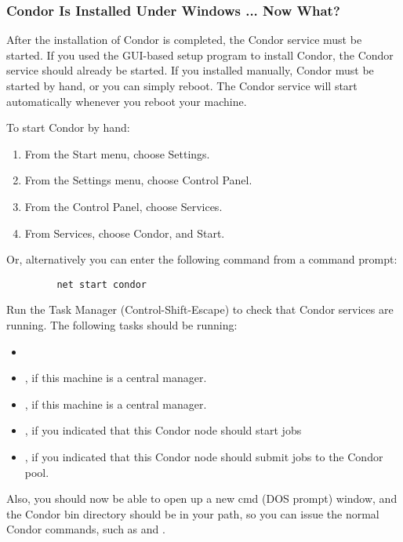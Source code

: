 \subsubsection{\label{nt-installed-now-what}
Condor Is Installed Under Windows ... Now What?}

After the installation of Condor is completed, the Condor service
must be started.  If you used the GUI-based setup program to install
Condor, the Condor service should already be started.  If you installed
manually, Condor must
be started by hand, or you can simply reboot. \Note The Condor service
will start automatically whenever you reboot your machine.

To start Condor by hand:
\begin{enumerate}
\item From the Start menu, choose Settings.
\item From the Settings menu, choose Control Panel.
\item From the Control Panel, choose Services.
\item From Services, choose Condor, and Start.
\end{enumerate}

Or, alternatively you can enter the following command from a command prompt:
\begin{verbatim}
         net start condor
\end{verbatim}

Run the Task Manager (Control-Shift-Escape) to check that Condor
services are running.  The following tasks should
be running:  
\begin{itemize}
\item {}
\item {}, if this machine is a central manager.
\item {}, if this machine is a central manager.
\item {}, if you indicated that this Condor node should start jobs
\item {}, if you indicated that this Condor node should submit jobs
to the Condor pool.
\end{itemize}

Also, you should now be able to open up a new cmd (DOS prompt) window, and
the Condor bin directory should be in your path, so you can issue the normal
Condor commands, such as  and .

